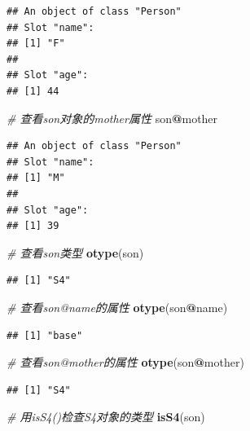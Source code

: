 \documentclass[]{book}
\newenvironment{Shaded}{\begin{snugshade}}{\end{snugshade}}
\newcommand{\KeywordTok}[1]{\textcolor[rgb]{0.13,0.29,0.53}{\textbf{#1}}}
\newcommand{\CommentTok}[1]{\textcolor[rgb]{0.56,0.35,0.01}{\textit{#1}}}
\newcommand{\OperatorTok}[1]{\textcolor[rgb]{0.81,0.36,0.00}{\textbf{#1}}}
\newcommand{\NormalTok}[1]{#1}
\begin{document}
\begin{verbatim}
## An object of class "Person"
## Slot "name":
## [1] "F"
## 
## Slot "age":
## [1] 44
\end{verbatim}

\begin{Shaded}
\begin{Highlighting}[]
\CommentTok{# 查看son对象的mother属性}
\NormalTok{son}\OperatorTok{@}\NormalTok{mother}
\end{Highlighting}
\end{Shaded}

\begin{verbatim}
## An object of class "Person"
## Slot "name":
## [1] "M"
## 
## Slot "age":
## [1] 39
\end{verbatim}

\begin{Shaded}
\begin{Highlighting}[]
\CommentTok{# 查看son类型}
\KeywordTok{otype}\NormalTok{(son)}
\end{Highlighting}
\end{Shaded}

\begin{verbatim}
## [1] "S4"
\end{verbatim}

\begin{Shaded}
\begin{Highlighting}[]
\CommentTok{# 查看son@name的属性}
\KeywordTok{otype}\NormalTok{(son}\OperatorTok{@}\NormalTok{name)}
\end{Highlighting}
\end{Shaded}

\begin{verbatim}
## [1] "base"
\end{verbatim}

\begin{Shaded}
\begin{Highlighting}[]
\CommentTok{#  查看son@mother的属性}
\KeywordTok{otype}\NormalTok{(son}\OperatorTok{@}\NormalTok{mother)}
\end{Highlighting}
\end{Shaded}

\begin{verbatim}
## [1] "S4"
\end{verbatim}

\begin{Shaded}
\begin{Highlighting}[]
\CommentTok{# 用isS4()检查S4对象的类型}
\KeywordTok{isS4}\NormalTok{(son)}
\end{Highlighting}
\end{Shaded}
\end{document}
